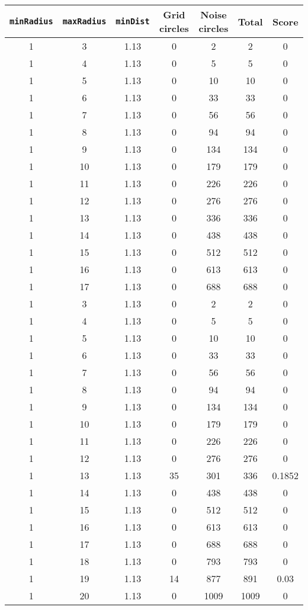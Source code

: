\documentclass[letterpaper, 12pt]{article}
\begin{document}
\begin{longtable}{|c|c|c|c|c|c|c|}
\hline
\textbf{\texttt{minRadius}} & \textbf{\texttt{maxRadius}} & \textbf{\texttt{minDist}} & \textbf{Grid circles} & \textbf{Noise circles} & \textbf{Total} & \textbf{Score} \\
\hline
1 & 3 & 1.13 & 0 & 2 & 2 & 0 \\
\hline
1 & 4 & 1.13 & 0 & 5 & 5 & 0 \\
\hline
1 & 5 & 1.13 & 0 & 10 & 10 & 0 \\
\hline
1 & 6 & 1.13 & 0 & 33 & 33 & 0 \\
\hline
1 & 7 & 1.13 & 0 & 56 & 56 & 0 \\
\hline
1 & 8 & 1.13 & 0 & 94 & 94 & 0 \\
\hline
1 & 9 & 1.13 & 0 & 134 & 134 & 0 \\
\hline
1 & 10 & 1.13 & 0 & 179 & 179 & 0 \\
\hline
1 & 11 & 1.13 & 0 & 226 & 226 & 0 \\
\hline
1 & 12 & 1.13 & 0 & 276 & 276 & 0 \\
\hline
1 & 13 & 1.13 & 0 & 336 & 336 & 0 \\
\hline
1 & 14 & 1.13 & 0 & 438 & 438 & 0 \\
\hline
1 & 15 & 1.13 & 0 & 512 & 512 & 0 \\
\hline
1 & 16 & 1.13 & 0 & 613 & 613 & 0 \\
\hline
1 & 17 & 1.13 & 0 & 688 & 688 & 0 \\
\hline
1 & 3 & 1.13 & 0 & 2 & 2 & 0 \\
\hline
1 & 4 & 1.13 & 0 & 5 & 5 & 0 \\
\hline
1 & 5 & 1.13 & 0 & 10 & 10 & 0 \\
\hline
1 & 6 & 1.13 & 0 & 33 & 33 & 0 \\
\hline
1 & 7 & 1.13 & 0 & 56 & 56 & 0 \\
\hline
1 & 8 & 1.13 & 0 & 94 & 94 & 0 \\
\hline
1 & 9 & 1.13 & 0 & 134 & 134 & 0 \\
\hline
1 & 10 & 1.13 & 0 & 179 & 179 & 0 \\
\hline
1 & 11 & 1.13 & 0 & 226 & 226 & 0 \\
\hline
1 & 12 & 1.13 & 0 & 276 & 276 & 0 \\
\hline
1 & 13 & 1.13 & 35 & 301 & 336 & 0.1852 \\
\hline
1 & 14 & 1.13 & 0 & 438 & 438 & 0 \\
\hline
1 & 15 & 1.13 & 0 & 512 & 512 & 0 \\
\hline
1 & 16 & 1.13 & 0 & 613 & 613 & 0 \\
\hline
1 & 17 & 1.13 & 0 & 688 & 688 & 0 \\
\hline
1 & 18 & 1.13 & 0 & 793 & 793 & 0 \\
\hline
1 & 19 & 1.13 & 14 & 877 & 891 & 0.03 \\
\hline
1 & 20 & 1.13 & 0 & 1009 & 1009 & 0 \\
\hline
\end{longtable}
\end{document}
